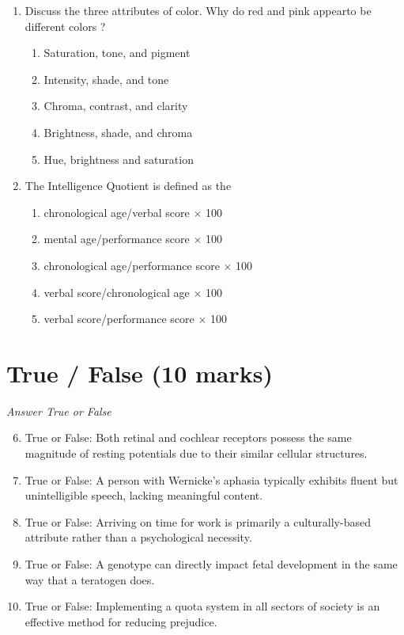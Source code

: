 \documentclass[12pt]{article}
\begin{document}
\begin{enumerate}[label=\arabic*.]
\begin{enumerate}[label=(\alph*)]
    \item specificity theory
    \item trichromatic
    \item gestalt theory
\end{enumerate}
\item Discuss the three attributes of color. Why do red and pink appearto be different colors ?
\begin{enumerate}[label=(\alph*)]
    \item Saturation, tone, and pigment
    \item Intensity, shade, and tone
    \item Chroma, contrast, and clarity
    \item Brightness, shade, and chroma
    \item Hue, brightness and saturation
\end{enumerate}
\item The Intelligence Quotient is defined as the
\begin{enumerate}[label=(\alph*)]
    \item chronological age/verbal score \ensuremath{\times} 100
    \item mental age/performance score \ensuremath{\times} 100
    \item chronological age/performance score \ensuremath{\times} 100
    \item verbal score/chronological age \ensuremath{\times} 100
    \item verbal score/performance score \ensuremath{\times} 100
\end{enumerate}
\end{enumerate}

\section*{True / False (10 marks)}
\textit{Answer True or False}
\begin{enumerate}[label=\arabic*.]
\setcounter{enumi}{5}
\item True or False: Both retinal and cochlear receptors possess the same magnitude of resting potentials due to their similar cellular structures.
\item True or False: A person with Wernicke's aphasia typically exhibits fluent but unintelligible speech, lacking meaningful content.
\item True or False: Arriving on time for work is primarily a culturally-based attribute rather than a psychological necessity.
\item True or False: A genotype can directly impact fetal development in the same way that a teratogen does.
\item True or False: Implementing a quota system in all sectors of society is an effective method for reducing prejudice.
\end{enumerate}
\end{document}
